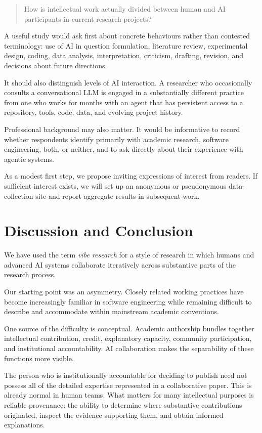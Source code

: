 \documentclass[12pt]{article}
\begin{document}
\begin{quote}
How is intellectual work actually divided between human and AI participants in current research projects?
\end{quote}

A useful study would ask first about concrete behaviours rather than contested terminology: use of AI in question formulation, literature review, experimental design, coding, data analysis, interpretation, criticism, drafting, revision, and decisions about future directions.

It should also distinguish levels of AI interaction. A researcher who occasionally consults a conversational LLM is engaged in a substantially different practice from one who works for months with an agent that has persistent access to a repository, tools, code, data, and evolving project history.

Professional background may also matter. It would be informative to record whether respondents identify primarily with academic research, software engineering, both, or neither, and to ask directly about their experience with agentic systems.

As a modest first step, we propose inviting expressions of interest from readers. If sufficient interest exists, we will set up an anonymous or pseudonymous data-collection site and report aggregate results in subsequent work.


\section{Discussion and Conclusion}

We have used the term \emph{vibe research} for a style of research in which humans and advanced AI systems collaborate iteratively across substantive parts of the research process.

Our starting point was an asymmetry. Closely related working practices have become increasingly familiar in software engineering while remaining difficult to describe and accommodate within mainstream academic conventions.

One source of the difficulty is conceptual. Academic authorship bundles together intellectual contribution, credit, explanatory capacity, community participation, and institutional accountability. AI collaboration makes the separability of these functions more visible.

The person who is institutionally accountable for deciding to publish need not possess all of the detailed expertise represented in a collaborative paper. This is already normal in human teams. What matters for many intellectual purposes is reliable provenance: the ability to determine where substantive contributions originated, inspect the evidence supporting them, and obtain informed explanations.
\end{document}
